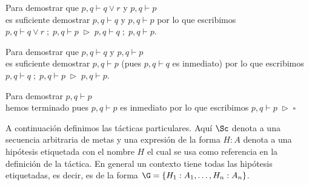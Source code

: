 \documentclass[11pt,letterpaper]{article}
\begin{document}
 \item Para demostrar que $p,q\vdash q\lor r$ y $p,q\vdash p$ \\
  es suficiente demostrar $p,q\vdash q$  y $p,q\vdash p$
  por lo que escribimos 
  $p,q\vdash q\lor r\; ; \;p,q\vdash p\;\rhd\; p,q\vdash q\; ; \;p,q\vdash p$.

 \item Para demostrar que $p,q\vdash q$ y $p,q\vdash p$ \\
 es suficiente demostrar $p,q\vdash p$ (pues $p,q\vdash q$ es inmediato)
por lo que escribimos 
$p,q\vdash q\; ; \;p,q\vdash p\;\rhd\;p,q\vdash p$.

 \item Para demostrar $p,q\vdash p$ \\
  hemos terminado pues $p,q\vdash p$ es inmediato por lo que escribimos 
  $p,q\vdash p\;\rhd\; \square$
\ei
\ei

A continuación definimos las tácticas particulares. Aquí $\Sc$ denota a una 
secuencia arbitraria de metas y una expresión de la forma $H:A$ denota a 
una hipótesis etiquetada con el nombre $H$ el cual se usa como referencia en la 
definición de la táctica. En general un contexto tiene todas las hipótesis 
etiquetadas, es decir, es de la forma $\G=\{H_1:A_1,\ldots,H_n:A_n\}$.
\end{document}
